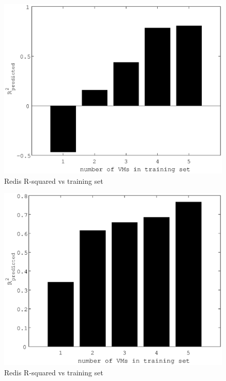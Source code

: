 \documentclass{acm_proc_article-sp}
\begin{document}
\begin{figure}
\centering
\includegraphics[scale = 0.5]{bar_read_avg_latency_r3_x_r3_2x_m3_x_r3__m3_2x_m3_.eps}
\caption{Redis R-squared vs training set}
\label{figure:redisbarread}
\end{figure}

\begin{figure}
\centering
\includegraphics[scale = 0.5]{bar_read_avg_latency_r3__r3_x_m3__m3_2x_r3_2x_m3_x.eps}
\caption{Redis R-squared vs training set}
\label{figure:redisbarread}
\end{figure}
\end{document}
